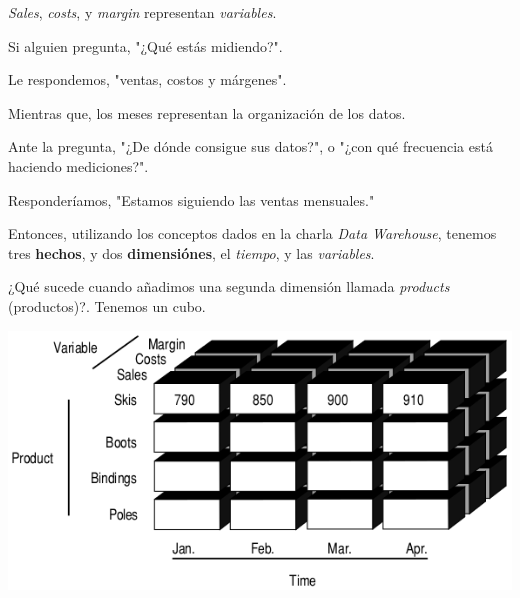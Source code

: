\documentclass{fancyslides}
\begin{document}
\begin{frame}
\misc
{
\textit{Sales}, \textit{costs}, y \textit{margin} representan \textit{variables}.

Si alguien pregunta, "¿Qué estás midiendo?".

Le respondemos, "ventas, costos y márgenes".

Mientras que, los meses representan la organización de los datos.

Ante la pregunta, "¿De dónde consigue sus datos?", o "¿con qué frecuencia está haciendo mediciones?".

Responderíamos, "Estamos siguiendo las ventas mensuales."
\newline

Entonces, utilizando los conceptos dados en la charla \textit{Data Warehouse}, tenemos tres \textbf{hechos},
y dos \textbf{dimensiónes}, el \textit{tiempo}, y las \textit{variables}.
}
\end{frame}

\begin{frame}
\misc
{
¿Qué sucede cuando añadimos una segunda dimensión llamada \textit{products} (productos)?.
Tenemos un cubo.

\begin{center}
\includegraphics[scale=0.4]{cube_2}
\end{center}
}
\end{frame}
\end{document}
